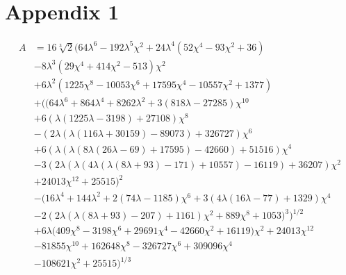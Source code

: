 \chapter{Appendix 1}
\label{appendix1}

\begin{equation}
    \begin{split}
    A &= 16 \sqrt[3]{2} \Big(64 \lambda ^6-192 \lambda ^5 \chi ^2+24 \lambda ^4 \left(52 \chi ^4-93 \chi ^2+36\right)\\
    &-8 \lambda ^3 \left(29 \chi ^4+414 \chi ^2-513\right) \chi ^2
    \\
    &+6 \lambda ^2 \left(1225 \chi ^8-10053 \chi ^6+17595 \chi ^4-10557 \chi ^2+1377\right)\\
    &+\bigg(\big(64 \lambda ^6+864 \lambda ^4+8262 \lambda ^2+3 (818 \lambda -27285) \chi ^{10}\\
    &+6 (\lambda  (1225 \lambda -3198)+27108) \chi ^8\\
    &-(2 \lambda  (\lambda  (116 \lambda +30159)-89073)+326727) \chi ^6\\
    &+6 (\lambda  (\lambda  (8 \lambda  (26 \lambda -69)+17595)-42660)+51516) \chi ^4\\
    &-3 (2 \lambda  (\lambda  (4 \lambda  (\lambda  (8 \lambda +93)-171)+10557)-16119)+36207) \chi ^2\\
    &+24013 \chi ^{12}+25515\big)^2\\
    &-\big(16 \lambda ^4+144 \lambda ^2+2 (74 \lambda -1185) \chi ^6+3 (4 \lambda  (16 \lambda -77)+1329) \chi ^4\\
    &-2 (2 \lambda  (\lambda  (8 \lambda +93)-207)+1161) \chi ^2+889 \chi ^8+1053\big)^3\bigg)^{1/2}\\
    &+6 \lambda  \big(409 \chi ^8-3198 \chi ^6+29691 \chi ^4-42660 \chi ^2+16119\big) \chi ^2+24013 \chi ^{12}\\
    &-81855 \chi ^{10}+162648 \chi ^8-326727 \chi ^6+309096 \chi ^4\\
    &-108621 \chi ^2+25515\Big)^{1/3}
    \end{split}
\end{equation}

